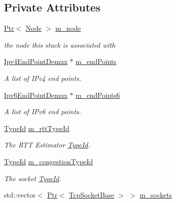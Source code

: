 \subsection*{Private Attributes}
\begin{DoxyCompactItemize}
\item 
\hyperlink{classns3_1_1Ptr}{Ptr}$<$ \hyperlink{classns3_1_1Node}{Node} $>$ \hyperlink{classns3_1_1TcpL4Protocol_a89e39fd5367f8ce22565f69e224de189}{m\+\_\+node}
\begin{DoxyCompactList}\small\item\em the node this stack is associated with \end{DoxyCompactList}\item 
\hyperlink{classns3_1_1Ipv4EndPointDemux}{Ipv4\+End\+Point\+Demux} $\ast$ \hyperlink{classns3_1_1TcpL4Protocol_a7ca53708bd7d91191af64a290095ebe7}{m\+\_\+end\+Points}
\begin{DoxyCompactList}\small\item\em A list of I\+Pv4 end points. \end{DoxyCompactList}\item 
\hyperlink{classns3_1_1Ipv6EndPointDemux}{Ipv6\+End\+Point\+Demux} $\ast$ \hyperlink{classns3_1_1TcpL4Protocol_a88deacf73247133fccfe64179ad665e3}{m\+\_\+end\+Points6}
\begin{DoxyCompactList}\small\item\em A list of I\+Pv6 end points. \end{DoxyCompactList}\item 
\hyperlink{classns3_1_1TypeId}{Type\+Id} \hyperlink{classns3_1_1TcpL4Protocol_aff3e46318717dcbce5f222e94b8345cd}{m\+\_\+rtt\+Type\+Id}
\begin{DoxyCompactList}\small\item\em The R\+TT Estimator \hyperlink{classns3_1_1TypeId}{Type\+Id}. \end{DoxyCompactList}\item 
\hyperlink{classns3_1_1TypeId}{Type\+Id} \hyperlink{classns3_1_1TcpL4Protocol_a2c724fd042748420d8a8df49e7ef28d7}{m\+\_\+congestion\+Type\+Id}
\begin{DoxyCompactList}\small\item\em The socket \hyperlink{classns3_1_1TypeId}{Type\+Id}. \end{DoxyCompactList}\item 
std\+::vector$<$ \hyperlink{classns3_1_1Ptr}{Ptr}$<$ \hyperlink{classns3_1_1TcpSocketBase}{Tcp\+Socket\+Base} $>$ $>$ \hyperlink{classns3_1_1TcpL4Protocol_a7f0bde5144a1bb7594e4cf366669bcbc}{m\+\_\+sockets}

\end{DoxyCompactItemize}
